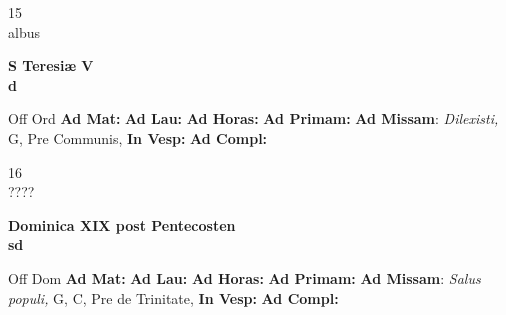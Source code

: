 \documentclass[10pt, openany]{book}
\begin{document}
    \begin{center}
        \begin{minipage}{3.5in}
            \vspace{2em}
            \begin{minipage}{0.5in}
                {\Huge 15} \\
                {\normalsize albus}
            \end{minipage}
            \begin{minipage}{3.0in}
                \textbf{ \large S Teresiæ V \\
                \textnormal{\normalsize d}}

            \end{minipage}
            \begin{justify}Off Ord
                \textbf{Ad Mat: }
                \textbf{Ad Lau: }
                \textbf{Ad Horas: }
                \textbf{Ad Primam: }\textbf{Ad Missam}: \textit{Dilexisti,} G, Pre Communis, 
                \textbf{In Vesp: }
                \textbf{Ad Compl: }
            \end{justify}
        \end{minipage}
    \end{center}

    \begin{center}
        \begin{minipage}{3.5in}
            \vspace{2em}
            \begin{minipage}{0.5in}
                {\Huge 16} \\
                {\normalsize ????}
            \end{minipage}
            \begin{minipage}{3.0in}
                \textbf{ \large Dominica XIX post Pentecosten \\
                \textnormal{\normalsize sd}}

            \end{minipage}
            \begin{justify}Off Dom
                \textbf{Ad Mat: }
                \textbf{Ad Lau: }
                \textbf{Ad Horas: }
                \textbf{Ad Primam: }\textbf{Ad Missam}: \textit{Salus populi,} G, C, Pre de Trinitate, 
                \textbf{In Vesp: }
                \textbf{Ad Compl: }
            \end{justify}
        \end{minipage}
    \end{center}
\end{document}
